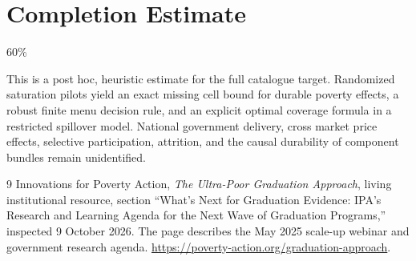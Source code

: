 \documentclass[11pt]{article}
\theoremstyle{remark}
\begin{document}
\section{Completion Estimate}
60\%

This is a post hoc, heuristic estimate for the full catalogue target.
Randomized saturation pilots yield an exact missing cell bound for durable poverty effects, a robust finite menu decision rule, and an explicit optimal coverage formula in a restricted spillover model. National government delivery, cross market price effects, selective participation, attrition, and the causal durability of component bundles remain unidentified.

\begin{thebibliography}{9}
 Innovations for Poverty Action, \emph{The Ultra-Poor Graduation Approach}, living institutional resource, section ``What's Next for Graduation Evidence: IPA's Research and Learning Agenda for the Next Wave of Graduation Programs,'' inspected 9 October 2026. The page describes the May 2025 scale-up webinar and government research agenda. \url{https://poverty-action.org/graduation-approach}.
\end{thebibliography}
\end{document}
